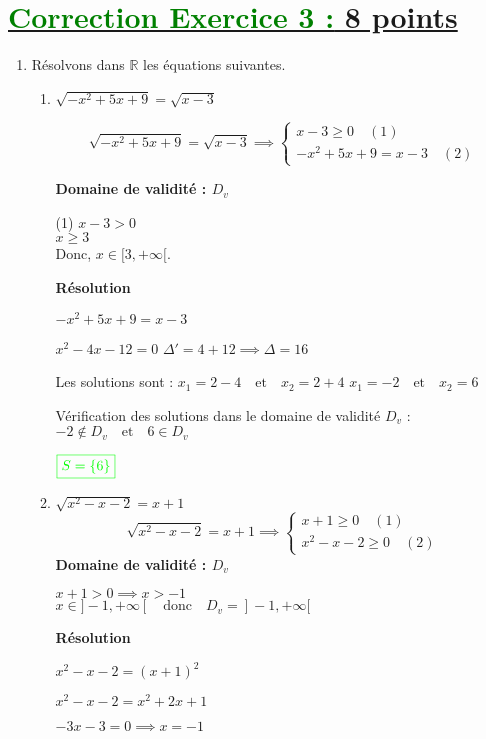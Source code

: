 \documentclass[12pt,a4paper]{article}
\begin{document}
\section*{\underline{\textcolor{green}{Correction Exercice 3 :} 8 points}}
\begin{enumerate}
    \item Résolvons dans $\mathbb{R}$ les équations suivantes.
    \begin{enumerate}
        \item $\sqrt{-x^2 + 5x + 9} = \sqrt{x - 3}$
        
\[
\sqrt{-x^2 + 5x + 9} = \sqrt{x-3}\implies
\begin{cases}
x - 3 \geq 0 \quad (1) \\
-x^2 + 5x + 9 =x-3 \quad (2)
\end{cases}
\]

\textbf{Domaine de validité : \( D_v \)}

(1) \( x - 3 > 0 \)  \\
   \(
   x \geq 3
   \)\\
   Donc, \( x \in [3, +\infty[ \).

\textbf{Résolution}
 
\(
-x^2 + 5x + 9 = x - 3
\)
 
\(
x^2 - 4x - 12 = 0
\)
\(
\Delta' = 4 + 12 \implies \Delta = 16
\)

Les solutions sont :  
\(
x_1 = 2 - 4 \quad \text{et} \quad x_2 = 2 + 4
\)
\(
x_1 = -2 \quad \text{et} \quad x_2 = 6
\)

\noindent Vérification des solutions dans le domaine de validité \( D_v \) :  
\(
-2 \notin D_v \quad \text{et} \quad 6 \in D_v
\)

\(
\textcolor{green}{\boxed{S = \{ 6 \}  }} 
\)
\item $ \sqrt{x^2 - x - 2} = x + 1$
\[
\sqrt{x^2 - x - 2} = x + 1\implies
\begin{cases}
x + 1 \geq 0 \quad (1) \\
x^2 - x - 2 \geq 0 \quad (2)
\end{cases}
\]
\textbf{Domaine de validité : \( D_v \)}

\( x + 1 > 0 \implies x > -1 \) \\  
\( x \in ]-1, +\infty[ \quad \text{donc} \quad D_v = ]-1, +\infty[ \)

\textbf{Résolution}

\( x^2 - x - 2 = (x+1)^2 \)

\( x^2 - x - 2 = x^2 + 2x + 1 \)

\( -3x - 3 = 0 \implies x = -1 \)


\end{enumerate}
\end{enumerate}
\end{document}
